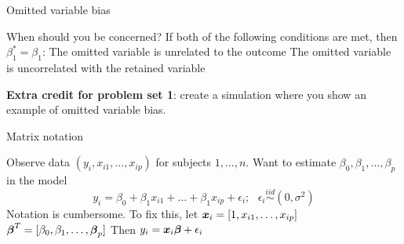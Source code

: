 \documentclass[table]{beamer}\usepackage[]{graphicx}\usepackage[]{color}
\begin{document}

\begin{frame}{Omitted variable bias}

\begin{block}{When should you be concerned?}
If both of the following conditions are met, then  $\beta^{*}_1 = \beta_1$:
\bi
        \myitem The omitted variable is unrelated to the outcome
	\myitem The omitted variable is uncorrelated with the retained variable
\ei
\end{block}

{\bf Extra credit for problem set 1}: create a simulation where you show an example of omitted variable bias. 

\end{frame}


\begin{frame}{Matrix notation}

\bi
        \myitem Observe data $(y_i, x_{i1}, \ldots, x_{ip})$ for subjects $1, \ldots, n$. Want to estimate $\beta_0, \beta_1, \ldots, \beta_p$ in the model
	$$ y_i = \beta_0 + \beta_1x_{i1} + \ldots + \beta_1x_{ip} + \epsilon_i; \mbox{ } \epsilon_i \stackrel{iid}{\sim} (0,\sigma^2)$$
	\myitem Notation is cumbersome. To fix this, let
	\bi
		\myitem $\boldsymbol{x}_i = [1, x_{i1}, \ldots, x_{ip}]$
		\myitem $\boldsymbol{\beta}^{T} = [\beta_0, \beta_1, \ldots, \boldsymbol{\beta}_{p}]$
		\myitem Then $y_i = \boldsymbol{x}_i \boldsymbol{\beta} + \epsilon_i$
	\ei
\ei

\end{frame}


\end{document}

